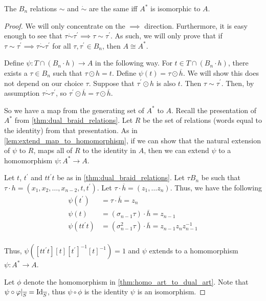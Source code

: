 \begin{theorem}
	The $B_n$ relations $\sim$ and $\dot\sim$ are the same iff $A^*$ is isomorphic to $A$.
\end{theorem}
\begin{proof}
	We will only concentrate on the $\implies$ direction. Furthermore, it is easy enough to see that $\tau \dot\sim \tau^\prime \implies \tau \sim \tau^\prime$.
	As such, we will only prove that if $\tau \sim \tau^\prime \implies \tau \dot\sim \tau^\prime$ for all $\tau,\tau^\prime \in B_n$, then $A\cong A^*$.

	Define $\psi \colon T \cap (B_n \cdot h) \to A$ in the following way.
	For $t \in T \cap (B_n \cdot h)$, there exists a $\tau \in B_n$ such that $\tau \odot h = t$.
	Define  $\psi(t) = \tau \odot \overline{h}$.
	We will show this does not depend on our choice $\tau$.
	Suppose that $\tau^\prime \odot h$ is also $t$.
	Then  $\tau \sim \tau^\prime$.
	Then, by assumption $\tau \dot\sim \tau^\prime$, so $\tau^\prime\odot \overline{h} = \tau \odot\overline{h}$.

	So we have a map from the generating set of $A^*$ to $A$.
	Recall the presentation of $A^*$ from \cref{thm:dual_braid_relations}.
	Let $R$ be the set of relations (words equal to the identity) from that presentation.
	As in \cref{lem:extend_map_to_homomorphism}, if we can show that the natural extension of $\psi$ to $R$, maps all of $R$ to the identity in $A$, then we can extend $\psi$ to a homomorphism $\psi \colon A^* \to A$.

	Let $t$, $t^\prime$ and $t t^\prime t$ be as in \cref{thm:dual_braid_relations}. Let $\tau B_n$ be such that $\tau \cdot h = (x_1, x_2, \ldots, x_{n-2}, t, t^\prime)$. Let $\tau \cdot \overline{h} = (z_1, \ldots z_n)$. Thus, we have the following
	\begin{align*}
		\psi(t^\prime)     & = \tau \cdot \overline{h} = z_n                                    \\
		\psi(t)            & = (\sigma_{n-1}\tau) \cdot \overline{h} = z_{n-1}                  \\
		\psi(t t^\prime t) & = (\sigma_{n-1}^2\tau) \cdot \overline{h} = z_{n-1}z_nz_{n-1}^{-1} \\
	\end{align*}

	Thus, $\psi( [t t^\prime t][t][t^\prime]^{-1}[t]^{-1} ) = 1$ and $\psi$ extends to a homomorphism $\psi \colon A^* \to A$.

	Let $\phi$ denote the homomorphism in \cref{thm:homo_art_to_dual_art}.
	Note that $\psi \circ \varphi |_{\overline{S}} = \operatorname{Id}_{\overline{S}}$, thus  $\psi \circ \phi$ is the identity $\psi$ is an isomorphism.
\end{proof}

